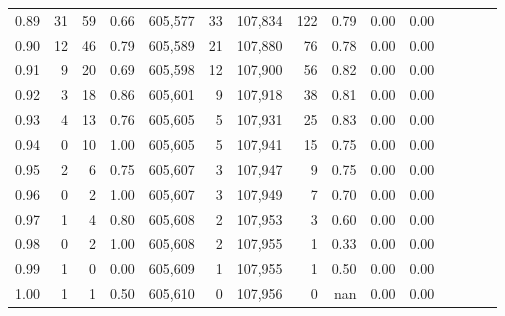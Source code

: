 \begin{tabular}{rrrcrrrrrrrrrrr}
0.89 &      31 &     59 &                                       0.66 &  605,577 &       33 &  107,834 &      122 &  0.79 &  0.00 &                         0.00 \\
0.90 &      12 &     46 &                                       0.79 &  605,589 &       21 &  107,880 &       76 &  0.78 &  0.00 &                         0.00 \\
0.91 &       9 &     20 &                                       0.69 &  605,598 &       12 &  107,900 &       56 &  0.82 &  0.00 &                         0.00 \\
0.92 &       3 &     18 &                                       0.86 &  605,601 &        9 &  107,918 &       38 &  0.81 &  0.00 &                         0.00 \\
0.93 &       4 &     13 &                                       0.76 &  605,605 &        5 &  107,931 &       25 &  0.83 &  0.00 &                         0.00 \\
0.94 &       0 &     10 &                                       1.00 &  605,605 &        5 &  107,941 &       15 &  0.75 &  0.00 &                         0.00 \\
0.95 &       2 &      6 &                                       0.75 &  605,607 &        3 &  107,947 &        9 &  0.75 &  0.00 &                         0.00 \\
0.96 &       0 &      2 &                                       1.00 &  605,607 &        3 &  107,949 &        7 &  0.70 &  0.00 &                         0.00 \\
0.97 &       1 &      4 &                                       0.80 &  605,608 &        2 &  107,953 &        3 &  0.60 &  0.00 &                         0.00 \\
0.98 &       0 &      2 &                                       1.00 &  605,608 &        2 &  107,955 &        1 &  0.33 &  0.00 &                         0.00 \\
0.99 &       1 &      0 &                                       0.00 &  605,609 &        1 &  107,955 &        1 &  0.50 &  0.00 &                         0.00 \\
1.00 &       1 &      1 &                                       0.50 &  605,610 &        0 &  107,956 &        0 &   nan &  0.00 &                         0.00 \\
\bottomrule
\end{tabular}
